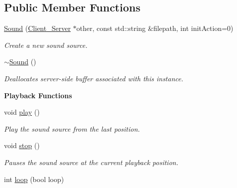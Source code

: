 \subsection*{Public Member Functions}
\begin{DoxyCompactItemize}
\item 
\hypertarget{classColliderPlusPlus_1_1Sound_ac1e87781b6bb69d6a250d2eaab360994}{\hyperlink{classColliderPlusPlus_1_1Sound_ac1e87781b6bb69d6a250d2eaab360994}{Sound} (\hyperlink{classColliderPlusPlus_1_1Client__Server}{Client\-\_\-\-Server} $\ast$other, const std\-::string \&filepath, int init\-Action=0)}\label{classColliderPlusPlus_1_1Sound_ac1e87781b6bb69d6a250d2eaab360994}

\begin{DoxyCompactList}\small\item\em Create a new sound source. \end{DoxyCompactList}\item 
\hypertarget{classColliderPlusPlus_1_1Sound_a0ae9f80837e343e016952def28815072}{\hyperlink{classColliderPlusPlus_1_1Sound_a0ae9f80837e343e016952def28815072}{$\sim$\-Sound} ()}\label{classColliderPlusPlus_1_1Sound_a0ae9f80837e343e016952def28815072}

\begin{DoxyCompactList}\small\item\em Deallocates server-\/side buffer associated with this instance. \end{DoxyCompactList}\end{DoxyCompactItemize}
\begin{Indent}{\bf Playback Functions}\par
\begin{DoxyCompactItemize}
\item 
\hypertarget{classColliderPlusPlus_1_1Sound_a555d34089f5c74363b837ffaf4a66c45}{void \hyperlink{classColliderPlusPlus_1_1Sound_a555d34089f5c74363b837ffaf4a66c45}{play} ()}\label{classColliderPlusPlus_1_1Sound_a555d34089f5c74363b837ffaf4a66c45}

\begin{DoxyCompactList}\small\item\em Play the sound source from the last position. \end{DoxyCompactList}\item 
\hypertarget{classColliderPlusPlus_1_1Sound_a7010e6bcdd47d51b359c364883574a5d}{void \hyperlink{classColliderPlusPlus_1_1Sound_a7010e6bcdd47d51b359c364883574a5d}{stop} ()}\label{classColliderPlusPlus_1_1Sound_a7010e6bcdd47d51b359c364883574a5d}

\begin{DoxyCompactList}\small\item\em Pauses the sound source at the current playback position. \end{DoxyCompactList}\item 
int \hyperlink{classColliderPlusPlus_1_1Sound_aad17d4b990faae4cf90c281e33d06155}{loop} (bool loop)
\end{DoxyCompactItemize}
\end{Indent}
